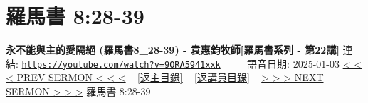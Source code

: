 \documentclass{book}
\begin{document}
\section{羅馬書 8:28-39}
\label{sec:9ORA5941xxk}
\textbf{永不能與主的愛隔絕 (羅馬書8\_28-39) - 袁惠鈞牧師[羅馬書系列 - 第22講]}
\newline
\newline
連結: \href{https://youtube.com/watch?v=9ORA5941xxk}{\texttt{https://youtube.com/watch?v=9ORA5941xxk}} ~~~~ 語音日期: 2025-01-03
\newline
\newline
\hyperref[sec:KIOzsSOi_wU]{< < < PREV SERMON < < <}
~
\hyperlink{toc}{[返主目錄]}
~
\hyperref[ch:preacher11]{[返講員目錄]}
~
\hyperref[sec:w_ajWsBZ9eQ]{> > > NEXT SERMON > > >}
\newline
\newline
羅馬書 8:28-39
\newline
\end{document}
